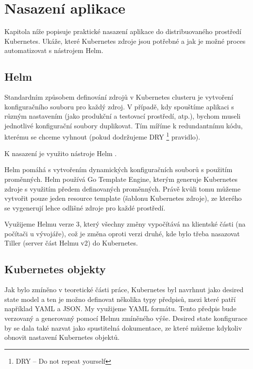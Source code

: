 \documentclass[thesis=M,czech]{FITthesis}[2019/12/23]
\theoremstyle{plain}
\theoremstyle{definition}
\begin{document}
\section{Nasazení aplikace}

Kapitola níže popisuje praktické nasazení aplikace do distribuovaného prostředí Kubernetes. Ukáže, které Kubernetes zdroje jsou potřebné a jak je možné proces automatizovat s nástrojem Helm. 


\subsection{Helm}



Standardním způsobem definování zdrojů v Kubernetes clusteru je vytvoření konfiguračního souboru pro každý zdroj. V případě, kdy spouštíme aplikaci s různým nastavením (jako produkční a testovací prostředí, atp.), bychom museli jednotlivé konfigurační soubory duplikovat. Tím míříme k redundantnímu kódu, kterému se chceme vyhnout (pokud dodržujeme DRY \footnote{DRY -- Do not repeat yourself} pravidlo).

K nasazení je využito nástroje Helm \cite{helm-docs}.

Helm pomáhá s vytvořením dynamických konfiguračních souborů s použitím proměnných. Helm používá Go Template Engine, kterým generuje Kubernetes zdroje s využitím předem definovaných proměnných. Právě kvůli tomu můžeme vytvořit pouze jeden resource template (šablonu Kubernetes zdroje), ze kterého se vygenerují lehce odlišné zdroje pro každé prostředí. 

Využijeme Helmu verze 3, který všechny změny vypočítává na klientské části (na počítači u vývojáře), což je změna oproti verzi druhé, kde bylo třeba nasazovat Tiller (server část Helmu v2) do Kubernetes.

\subsection{Kubernetes objekty}


Jak bylo zmíněno v teoretické části práce, Kubernetes byl navrhnut jako desired state model a ten je možno definovat několika typy předpisů, mezi které patří například YAML a JSON. My využijeme YAML formátu. Tento předpis bude verzovaný a generovaný pomocí Helmu zmíněného výše. Desired state konfigurace by se dala také nazvat jako spustitelná dokumentace, ze které můžeme kdykoliv obnovit nastavení Kubernetes objektů. 
\end{document}
